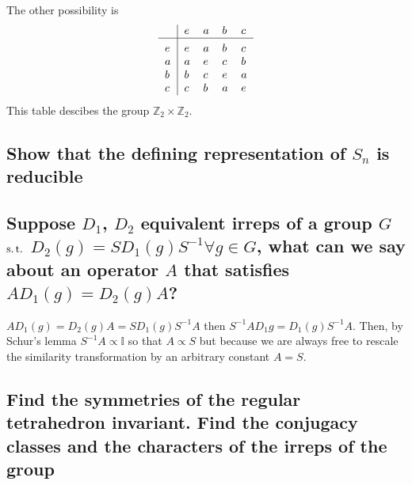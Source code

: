 \documentclass[main.tex]{subfiles}
\begin{document}
The other possibility is
\[
    \begin{tabular}{>{$}l<{$}|*{4}{>{$}l<{$}}}
    ~   & e   & a   & b & c    \\
    \hline\vrule height 12pt width 0pt
    e   & e   & a  & b  & c  \\
    a   & a   & e  & c  & b  \\
    b   & b   & c  & e  & a  \\
    c   & c   & b  & a  & e  \\
    \end{tabular} 
\]
This table descibes the group $\mathbb{Z}_2\times\mathbb{Z}_2$.
\subsection{ Show that the defining representation of $S_n$ is reducible}
\subsection{ Suppose $D_1$, $D_2$ equivalent irreps of a group $G$ $\operatorname{s.t.}$ $D_2(g)=SD_1(g)S^{-1}\forall g\in G$, what can we say about an operator $A$ that satisfies $AD_1(g)=D_2(g)A$?}
$AD_1(g)=D_2(g)A=SD_1(g)S^{-1}A$ then $S^{-1}AD_1{g}=D_1(g)S^{-1}A$. Then, by Schur's lemma $S^{-1}A\propto\mathbb{I}$ so that $A\propto S$ but because we are always free to rescale the similarity transformation by an arbitrary constant $A=S$.
\subsection{Find the symmetries of the regular tetrahedron invariant. Find the conjugacy classes and the characters of the irreps of the group}
\end{document}
